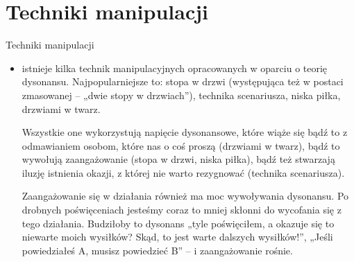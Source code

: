\documentclass{beamer}
\begin{document}
\section{Techniki manipulacji}
\begin{frame}{Techniki manipulacji}
\begin{itemize}
\item
istnieje kilka technik manipulacyjnych opracowanych w oparciu o teorię dysonansu. Najpopularniejsze to: stopa w drzwi (występująca też w postaci zmasowanej – „dwie stopy w drzwiach”), technika scenariusza, niska piłka, drzwiami w twarz.

Wszystkie one wykorzystują napięcie dysonansowe, które wiąże się bądź to z odmawianiem osobom, które nas o coś proszą (drzwiami w twarz), bądź to wywołują zaangażowanie (stopa w drzwi, niska piłka), bądź też stwarzają iluzję istnienia okazji, z której nie warto rezygnować (technika scenariusza).

Zaangażowanie się w działania również ma moc wywoływania dysonansu. Po drobnych poświęceniach jesteśmy coraz to mniej skłonni do wycofania się z tego działania. Budziłoby to dysonans „tyle poświęciłem, a okazuje się to niewarte moich wysiłków? Skąd, to jest warte dalszych wysiłków!”, „Jeśli powiedziałeś A, musisz powiedzieć B” – i zaangażowanie rośnie.
\end{itemize}
\end{frame}
\end{document}
